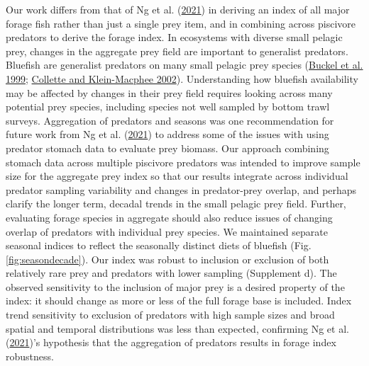 \documentclass[
]{article}
\begin{document}
Our work differs from that of Ng et al. (\protect\hyperlink{ref-ng_predator_2021}{2021}) in deriving an index of all major forage fish rather than just a single prey item, and in combining across piscivore predators to derive the forage index. In ecosystems with diverse small pelagic prey, changes in the aggregate prey field are important to generalist predators. Bluefish are generalist predators on many small pelagic prey species (\protect\hyperlink{ref-buckel_foraging_1999}{Buckel et al. 1999}; \protect\hyperlink{ref-collette_bigelow_2002}{Collette and Klein-Macphee 2002}). Understanding how bluefish availability may be affected by changes in their prey field requires looking across many potential prey species, including species not well sampled by bottom trawl surveys. Aggregation of predators and seasons was one recommendation for future work from Ng et al. (\protect\hyperlink{ref-ng_predator_2021}{2021}) to address some of the issues with using predator stomach data to evaluate prey biomass. Our approach combining stomach data across multiple piscivore predators was intended to improve sample size for the aggregate prey index so that our results integrate across individual predator sampling variability and changes in predator-prey overlap, and perhaps clarify the longer term, decadal trends in the small pelagic prey field. Further, evaluating forage species in aggregate should also reduce issues of changing overlap of predators with individual prey species. We maintained separate seasonal indices to reflect the seasonally distinct diets of bluefish (Fig. \ref{fig:seasondecade}). Our index was robust to inclusion or exclusion of both relatively rare prey and predators with lower sampling (Supplement d). The observed sensitivity to the inclusion of major prey is a desired property of the index: it should change as more or less of the full forage base is included. Index trend sensitivity to exclusion of predators with high sample sizes and broad spatial and temporal distributions was less than expected, confirming Ng et al. (\protect\hyperlink{ref-ng_predator_2021}{2021})'s hypothesis that the aggregation of predators results in forage index robustness.
\end{document}
